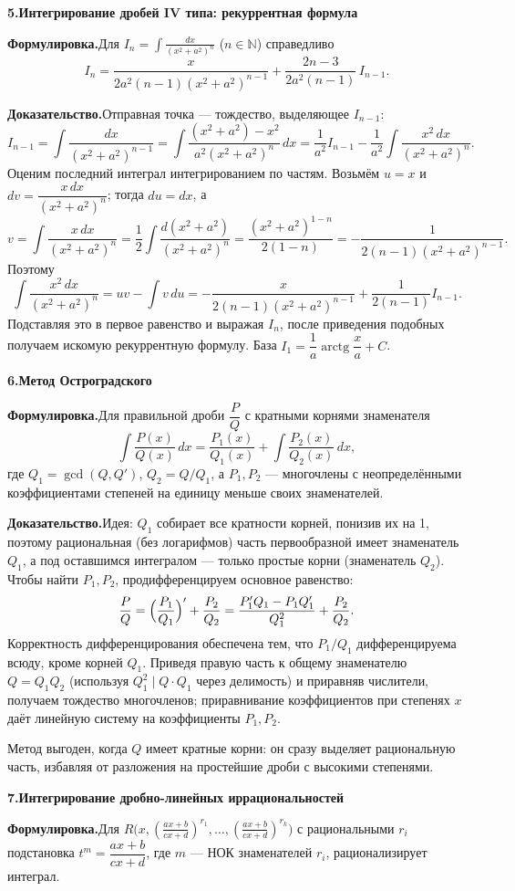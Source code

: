 \documentclass[10pt,a4paper]{article}
\DeclareMathOperator{\arctg}{arctg}
\newcommand{\N}{\mathbb{N}}
\newcommand{\dx}{\,dx}
\theoremstyle{definition}
\theoremstyle{plain}
\newcommand{\writespace}{\vspace{7.5mm}}
\newcommand{\prf}[2]{%
  \par\writespace\noindent
  {\large\bfseries\color{accent}#1.\enspace #2}\par\smallskip}
\newcommand{\stmt}{\par\noindent\textbf{Формулировка.}\enspace}
\newcommand{\dok}{\par\noindent\textbf{Доказательство.}\enspace}
\begin{document}
\prf{5}{Интегрирование дробей IV типа: рекуррентная формула}
\stmt Для $I_n=\displaystyle\int\frac{dx}{(x^2+a^2)^n}$ ($n\in\N$) справедливо
\[
  I_n=\frac{x}{2a^2(n-1)(x^2+a^2)^{n-1}}+\frac{2n-3}{2a^2(n-1)}\,I_{n-1}.
\]

\dok Отправная точка — тождество, выделяющее $I_{n-1}$:
\[
  I_{n-1}=\int\frac{dx}{(x^2+a^2)^{n-1}}
  =\int\frac{(x^2+a^2)-x^2}{a^2(x^2+a^2)^{n}}\dx
  =\frac{1}{a^2}I_{n-1}-\frac1{a^2}\int\frac{x^2\dx}{(x^2+a^2)^n}.
\]
Оценим последний интеграл интегрированием по частям. Возьмём $u=x$ и
$dv=\dfrac{x\dx}{(x^2+a^2)^n}$; тогда $du=dx$, а
\[
  v=\int\frac{x\dx}{(x^2+a^2)^n}=\frac{1}{2}\int\frac{d(x^2+a^2)}{(x^2+a^2)^n}
   =\frac{(x^2+a^2)^{1-n}}{2(1-n)}=-\frac1{2(n-1)(x^2+a^2)^{n-1}}.
\]
Поэтому
\[
  \int\frac{x^2\dx}{(x^2+a^2)^n}=uv-\int v\,du
  =-\frac{x}{2(n-1)(x^2+a^2)^{n-1}}+\frac1{2(n-1)}I_{n-1}.
\]
Подставляя это в первое равенство и выражая $I_n$, после приведения подобных получаем искомую
рекуррентную формулу. База $I_1=\dfrac1a\arctg\dfrac xa+C$.

\prf{6}{Метод Остроградского}
\stmt Для правильной дроби $\dfrac{P}{Q}$ с кратными корнями знаменателя
\[
  \int\frac{P(x)}{Q(x)}\dx=\frac{P_1(x)}{Q_1(x)}+\int\frac{P_2(x)}{Q_2(x)}\dx,
\]
где $Q_1=\gcd(Q,Q')$, $Q_2=Q/Q_1$, а $P_1,P_2$ — многочлены с неопределёнными коэффициентами
степеней на единицу меньше своих знаменателей.

\dok Идея: $Q_1$ собирает все кратности корней, понизив их на 1, поэтому рациональная (без
логарифмов) часть первообразной имеет знаменатель $Q_1$, а под оставшимся интегралом — только
простые корни (знаменатель $Q_2$). Чтобы найти $P_1,P_2$, продифференцируем основное равенство:
\[
  \frac{P}{Q}=\Bigl(\frac{P_1}{Q_1}\Bigr)'+\frac{P_2}{Q_2}
  =\frac{P_1'Q_1-P_1Q_1'}{Q_1^2}+\frac{P_2}{Q_2}.
\]
Корректность дифференцирования обеспечена тем, что $P_1/Q_1$ дифференцируема всюду, кроме корней
$Q_1$. Приведя правую часть к общему знаменателю $Q=Q_1Q_2$ (используя $Q_1^2\mid Q\cdot Q_1$ через
делимость) и приравняв числители, получаем тождество многочленов; приравнивание коэффициентов при
степенях $x$ даёт линейную систему на коэффициенты $P_1,P_2$.

Метод выгоден, когда $Q$ имеет кратные корни: он сразу выделяет рациональную часть, избавляя от
разложения на простейшие дроби с высокими степенями.

\prf{7}{Интегрирование дробно-линейных иррациональностей}
\stmt Для $R\bigl(x,(\tfrac{ax+b}{cx+d})^{r_1},\dots,(\tfrac{ax+b}{cx+d})^{r_k}\bigr)$ с
рациональными $r_i$ подстановка $t^m=\dfrac{ax+b}{cx+d}$, где $m$ — НОК знаменателей $r_i$,
рационализирует интеграл.
\end{document}
